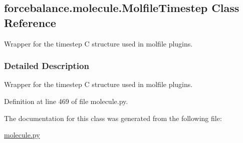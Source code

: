\hypertarget{classforcebalance_1_1molecule_1_1MolfileTimestep}{\subsection{forcebalance.\-molecule.\-Molfile\-Timestep \-Class \-Reference}
\label{classforcebalance_1_1molecule_1_1MolfileTimestep}
}


\-Wrapper for the timestep \-C structure used in molfile plugins.  




\subsubsection{\-Detailed \-Description}
\-Wrapper for the timestep \-C structure used in molfile plugins. 



\-Definition at line 469 of file molecule.\-py.



\-The documentation for this class was generated from the following file\-:\begin{DoxyCompactItemize}
\item 
\hyperlink{molecule_8py}{molecule.\-py}\end{DoxyCompactItemize}
